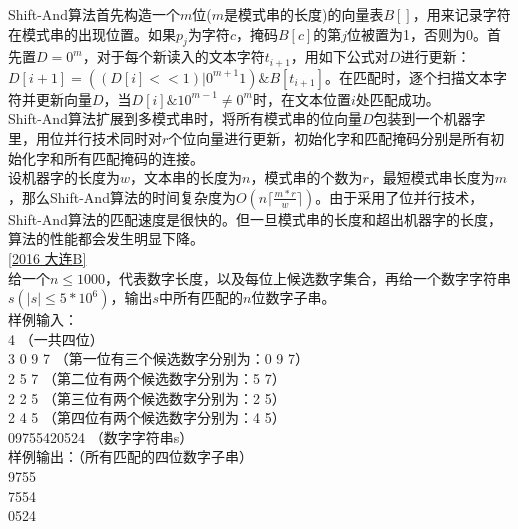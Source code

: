 Shift-And算法首先构造一个$m$位($m$是模式串的长度)的向量表$B[]$，用来记录字符在模式串的出现位置。如果$p_j$为字符$c$，掩码$B[c]$的第$j$位被置为1，否则为0。首先置$D=0^m$，对于每个新读入的文本字符$t_{i+1}$，用如下公式对$D$进行更新：$D[i+1]=((D[i]<<1)|0^{m+1}1)\&B[t_{i+1}]$。在匹配时，逐个扫描文本字符并更新向量$D$，当$D[i]\&10^{m-1}≠0^{m}$时，在文本位置$i$处匹配成功。 \\

Shift-And算法扩展到多模式串时，将所有模式串的位向量$D$包装到一个机器字里，用位并行技术同时对$r$个位向量进行更新，初始化字和匹配掩码分别是所有初始化字和所有匹配掩码的连接。 \\

设机器字的长度为$w$，文本串的长度为$n$，模式串的个数为$r$，最短模式串长度为$m$，那么Shift-And算法的时间复杂度为$O(n\lceil \frac{m*r}{w}\rceil)$。由于采用了位并行技术，Shift-And算法的匹配速度是很快的。但一旦模式串的长度和超出机器字的长度，算法的性能都会发生明显下降。\\
\underline{[2016 大连B]} \\

给一个$n\leq 1000$，代表数字长度，以及每位上候选数字集合，再给一个数字字符串$s(|s|\leq 5*10^{6})$，输出$s$中所有匹配的$n$位数字子串。\\
样例输入：\\
4 （一共四位） \\
3 0 9 7 （第一位有三个候选数字分别为：0 9 7） \\
2 5 7   （第二位有两个候选数字分别为：5 7） \\
2 2 5   （第三位有两个候选数字分别为：2 5） \\
2 4 5   （第四位有两个候选数字分别为：4 5） \\
09755420524 （数字字符串s） \\
样例输出：（所有匹配的四位数字子串） \\
9755 \\
7554 \\
0524 \\

